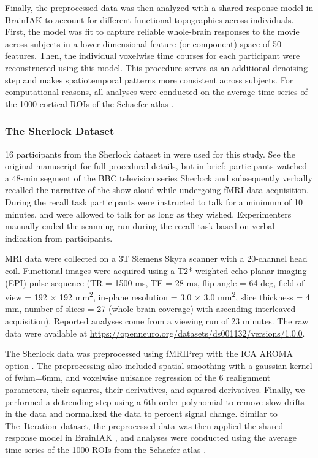 Finally, the preprocessed data was then analyzed with a shared response model
\citep{Chen2015ReducedDimensionfMRI} in BrainIAK
\citep{Kumar2020BrainIAKBrainImaging} to account for different functional
topographies across individuals. First, the model was fit to capture reliable
whole-brain responses to the movie across subjects in a lower dimensional
feature (or component) space of 50 features. Then, the individual voxelwise time
courses for each participant were reconstructed using this model. This procedure
serves as an additional denoising step and makes spatiotemporal patterns more
consistent across subjects. For computational reasons, all analyses were
conducted on the average time-series of the 1000 cortical ROIs of the Schaefer
atlas \citep{Schaefer2017LocalGlobalParcellation}.

\subsubsection*{The Sherlock Dataset}\label{the-sherlock-dataset}

16 participants from the Sherlock dataset in
\citep{Chen2017Sharedmemoriesreveal} were used for this study. See the original
manuscript for full procedural details, but in brief: participants watched a
48-min segment of the BBC television series Sherlock and subsequently verbally
recalled the narrative of the show aloud while undergoing fMRI data acquisition.
During the recall task participants were instructed to talk for a minimum of 10
minutes, and were allowed to talk for as long as they wished. Experimenters
manually ended the scanning run during the recall task based on verbal
indication from participants.

MRI data were collected on a 3T Siemens Skyra scanner with a 20-channel head
coil. Functional images were acquired using a T2*-weighted echo-planar imaging
(EPI) pulse sequence (TR = 1500 ms, TE = 28 ms, flip angle = 64 deg, field of
view = 192 $\times$ 192 mm\textsuperscript{2}, in-plane resolution = 3.0
$\times$ 3.0 mm\textsuperscript{2}, slice thickness = 4 mm, number of slices =
27 (whole-brain coverage) with ascending interleaved acquisition). Reported
analyses come from a viewing run of 23 minutes. The raw data were available at
\href{https://openneuro.org/datasets/ds001132/versions/1.0.0}{https://openneuro.org/datasets/ds001132/versions/1.0.0}.

The Sherlock data was preprocessed using fMRIPrep
\citep{Esteban2018fMRIPreprobustpreprocessing} with the ICA AROMA option
\citep{Pruim2015ICAAROMArobust}. The preprocessing also included spatial
smoothing with a gaussian kernel of fwhm=6mm, and voxelwise nuisance regression
of the 6 realignment parameters, their squares, their derivatives, and squared
derivatives. Finally, we performed a detrending step using a 6th order
polynomial to remove slow drifts in the data and normalized the data to percent
signal change. Similar to The~Iteration~dataset, the preprocessed data was then
applied the shared response model \citep{Chen2015ReducedDimensionfMRI} in
BrainIAK \citep{Kumar2020BrainIAKBrainImaging}, and analyses were conducted
using the average time-series of the 1000 ROIs from the Schaefer atlas
\citep{Schaefer2017LocalGlobalParcellation}.

